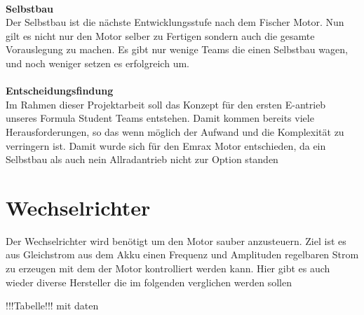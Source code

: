 \\
\textbf{Selbstbau}\\
Der Selbstbau ist die nächste Entwicklungsstufe nach dem Fischer Motor. Nun gilt es nicht nur den Motor selber zu Fertigen sondern auch die gesamte Vorauslegung zu machen. Es gibt nur wenige Teams die einen Selbstbau wagen, und noch weniger setzen es erfolgreich um.\\
\\
\textbf{Entscheidungsfindung}\\
Im Rahmen dieser Projektarbeit soll das Konzept für den ersten E-antrieb unseres Formula Student Teams entstehen. Damit kommen bereits viele Herausforderungen, so das wenn möglich der Aufwand und die Komplexität zu verringern ist. Damit wurde sich für den Emrax Motor entschieden, da ein Selbstbau als auch nein Allradantrieb nicht zur Option standen

\section{Wechselrichter}
Der Wechselrichter wird benötigt um den Motor sauber anzusteuern. Ziel ist es aus Gleichstrom aus dem Akku einen Frequenz und Amplituden regelbaren Strom zu erzeugen mit dem der Motor kontrolliert werden kann. Hier gibt es auch wieder diverse Hersteller die im folgenden verglichen werden sollen

!!!Tabelle!!! mit daten

